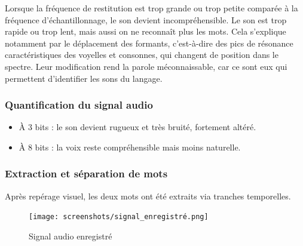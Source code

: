 Lorsque la fréquence de restitution est trop grande ou trop petite comparée à la fréquence d’échantillonnage, le son devient incompréhensible. Le son est trop rapide ou trop lent, mais aussi on ne reconnaît plus les mots. Cela s'explique notamment par le déplacement des formants, c’est-à-dire des pics de résonance caractéristiques des voyelles et consonnes, qui changent de position dans le spectre. Leur modification rend la parole méconnaissable, car ce sont eux qui permettent d’identifier les sons du langage.

\subsubsection{Quantification du signal audio}

\begin{itemize}
    \item À 3 bits : le son devient rugueux et très bruité, fortement altéré.
    \item À 8 bits : la voix reste compréhensible mais moins naturelle.
\end{itemize}

\subsubsection{Extraction et séparation de mots}

Après repérage visuel, les deux mots ont été extraits via tranches temporelles.


\begin{figure}[!h]
\centering
\texttt{[image: screenshots/signal\_enregistré.png]}
\caption{Signal audio enregistré}
\label{fig:signal_enregistre}
\end{figure}


